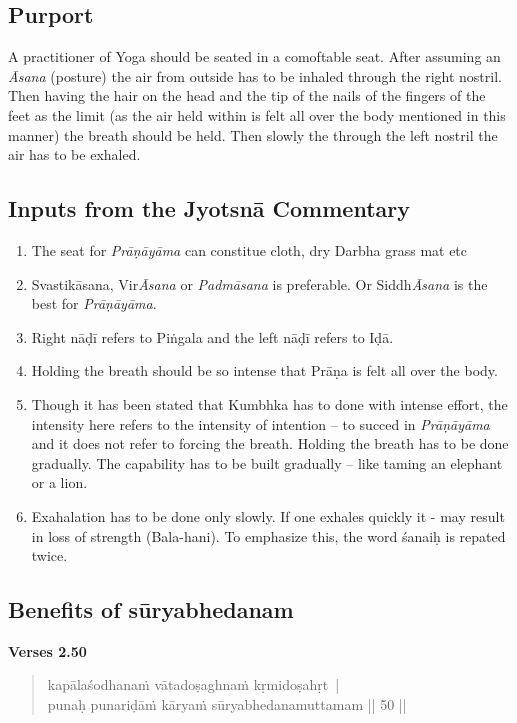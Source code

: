 \subsection*{Purport}

A practitioner of Yoga should be seated in a comoftable seat. After assuming an \textit{Āsana} (posture) the air from outside has to be inhaled through the right nostril.  Then having the hair on the head and the tip of the nails of the fingers of the feet as the limit (as the air held within is felt all over the body mentioned in this manner) the breath should be held. Then slowly the through the left nostril the air has to be exhaled. 

\subsection*{Inputs from the Jyotsnā Commentary}

\begin{enumerate}
\itemsep=0pt
\item The seat for \textit{Prāṇāyāma} can constitue cloth, dry Darbha grass mat etc
\item Svastikāsana, Vir\textit{Āsana} or \textit{Padmāsana} is preferable. Or Siddh\textit{Āsana} is the best for \textit{Prāṇāyāma}. 
\item Right nāḍī refers to Piṅgala and the left nāḍī refers to Iḍā. 
\item Holding the breath should be so intense that Prāṇa is felt all over the body. 
\item Though it has been stated that Kumbhka has to done with intense effort, the intensity here refers to the intensity of intention – to succed in \textit{Prāṇāyāma} and it does not refer to forcing the breath. Holding the breath has to be done gradually. The capability has to be built gradually – like taming an elephant or a lion. 
\item Exahalation has to be done only slowly. If one exhales quickly it - may result in loss of strength (Bala-hani). To emphasize this, the word śanaiḥ is repated twice.       
\end{enumerate}
\newpage
	
\subsection*{Benefits of sūryabhedanam}


\noindent \textbf{Verses 2.50}

\begin{verse}
kapālaśodhanaṁ vātadoṣaghnaṁ kṛmidoṣahṛt |\\
punaḥ punariḍāṁ kāryaṁ sūryabhedanamuttamam || 50 ||
\end{verse}

